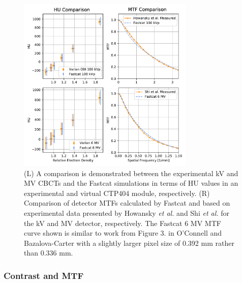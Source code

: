 \begin{figure}[ht!]
  \begin{center}
  \includegraphics[width=0.75\textwidth, clip]{figures/CNR_MTF.pdf}
  \caption{
  (L) A comparison is demonstrated between the experimental kV and MV CBCTs and the Fastcat simulations in terms of HU values in an experimental and virtual CTP404 module, respectively. (R) Comparison of detector MTFs calculated by Fastcat and based on experimental data presented by Howansky \textit{et al.} \cite{} and Shi \textit{et al.} \cite{Shi2018APerformance} for the kV and MV detector, respectively. The Fastcat 6 MV MTF curve shown is similar to work from Figure 3. in O’Connell and Bazalova-Carter \cite{OConnell2021FastCAT:Simulation} with a slightly larger pixel size of 0.392 mm rather than 0.336 mm.
  \label{HU} 
    }  %
    \end{center}
\end{figure}

\subsubsection{Contrast and MTF}

